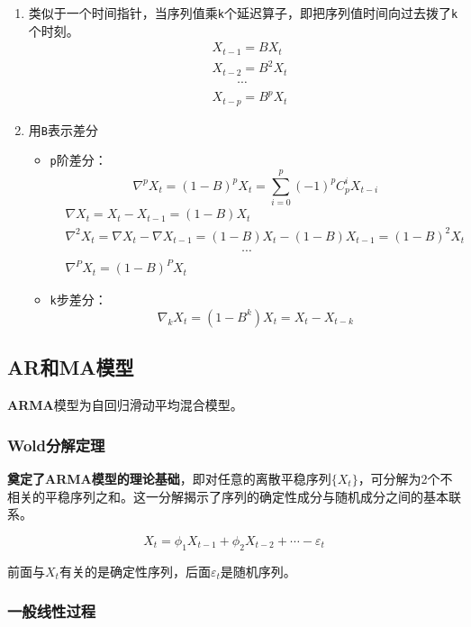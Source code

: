 \documentclass{article} %
\begin{document}
\begin{enumerate}
\item 类似于一个时间指针，当序列值乘\texttt{k}个延迟算子，即把序列值时间向过去拨了\texttt{k}个时刻。
  \[
  \begin{aligned}
  &X_{t-1}=BX_{t}\\
  &X_{t-2}=B^{2}X_{t}\\
  &\quad\quad\cdots\\
  &X_{t-p}=B^{p}X_{t}
  \end{aligned}
  \]
\item 用\texttt{B}表示差分
  \begin{itemize}
  \item \texttt{p}阶差分：
    \[
    \nabla^pX_t=(1-B)^pX_t=\sum_{i=0}^p(-1)^pC_p^iX_{t-i}
    \]
    \[
    \begin{aligned}
    &\nabla X_{t}=X_{t}-X_{t-1}=(1-B)X_{t}\\
    &\nabla^{2}X_{t}=\nabla X_{t}-\nabla X_{t-1}=(1-B)X_{t}-(1-B)X_{t-1}=(1-B)^{2}X_{t}\\
    &\quad\quad\quad\quad\quad\quad\quad\quad\quad\quad\quad\quad\quad\quad\cdots\\
    &\nabla^{P}X_{t}=(1-B)^{P}X_{t}
    \end{aligned}
    \]
  \item \texttt{k}步差分：
    \[
    \nabla_kX_t=(1-B^k)X_t=X_t-X_{t-k}
    \]
  \end{itemize}
\end{enumerate}

\subsection{\textbf{AR}和\textbf{MA}模型}

\textbf{ARMA}模型为自回归滑动平均混合模型。

\subsubsection{\textbf{Wold}分解定理}
\textbf{奠定了\textbf{ARMA}模型的理论基础}，即对任意的离散平稳序列$\{X_t\}$，可分解为2个不相关的平稳序列之和。这一分解揭示了序列的确定性成分与随机成分之间的基本联系。

\[X_t=\phi_1X_{t-1}+\phi_2X_{t-2}+\cdots-\varepsilon_t\]

前面与$X_t$有关的是确定性序列，后面$\varepsilon_t$是随机序列。

\subsubsection{一般线性过程}
\end{document}

